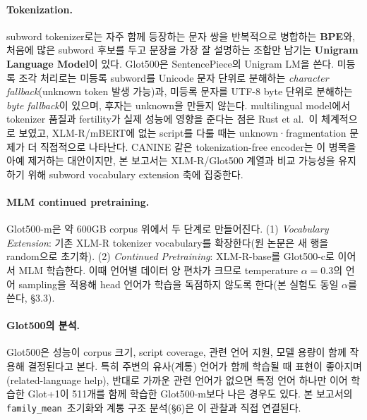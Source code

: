 \documentclass[11pt,a4paper]{article}
\newcommand{\famm}{\texttt{family\_mean}}
\begin{document}
\paragraph{Tokenization.} subword tokenizer로는 자주 함께 등장하는 문자 쌍을 반복적으로 병합하는 \textbf{BPE}와, 처음에 많은 subword 후보를 두고 문장을 가장 잘 설명하는 조합만 남기는 \textbf{Unigram Language Model}이 있다. Glot500은 SentencePiece의 Unigram LM을 쓴다. 미등록 조각 처리로는 미등록 subword를 Unicode 문자 단위로 분해하는 \emph{character fallback}(unknown token 발생 가능)과, 미등록 문자를 UTF-8 byte 단위로 분해하는 \emph{byte fallback}이 있으며, 후자는 unknown을 만들지 않는다. multilingual model에서 tokenizer 품질과 fertility가 실제 성능에 영향을 준다는 점은 Rust et al.\ 이 체계적으로 보였고, XLM-R/mBERT에 없는 script를 다룰 때는 unknown·fragmentation 문제가 더 직접적으로 나타난다\cite{rusttok,pfeifferunks}. CANINE 같은 tokenization-free encoder는 이 병목을 아예 제거하는 대안이지만\cite{canine}, 본 보고서는 XLM-R/Glot500 계열과 비교 가능성을 유지하기 위해 subword vocabulary extension 축에 집중한다.

\paragraph{MLM continued pretraining.} Glot500-m은 약 600GB corpus 위에서 두 단계로 만들어진다. (1) \emph{Vocabulary Extension}: 기존 XLM-R tokenizer vocabulary를 확장한다(원 논문은 새 행을 random으로 초기화). (2) \emph{Continued Pretraining}: XLM-R-base를 Glot500-c로 이어서 MLM 학습한다. 이때 언어별 데이터 양 편차가 크므로 temperature $\alpha=0.3$의 언어 sampling을 적용해 head 언어가 학습을 독점하지 않도록 한다(본 실험도 동일 $\alpha$를 쓴다, \S3.3).

\paragraph{Glot500의 분석.} Glot500은 성능이 corpus 크기, script coverage, 관련 언어 지원, 모델 용량이 함께 작용해 결정된다고 본다. 특히 주변의 유사(계통) 언어가 함께 학습될 때 표현이 좋아지며(related-language help), 반대로 가까운 관련 언어가 없으면 특정 언어 하나만 이어 학습한 Glot+1이 511개를 함께 학습한 Glot500-m보다 나은 경우도 있다. 본 보고서의 \famm\ 초기화와 계통 구조 분석(\S6)은 이 관찰과 직접 연결된다.
\end{document}
